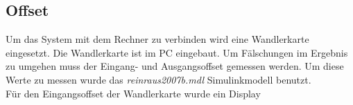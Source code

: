 \subsection{Offset}
Um das System mit dem Rechner zu verbinden wird eine Wandlerkarte eingesetzt. Die Wandlerkarte ist im PC eingebaut. Um Fälschungen im Ergebnis zu umgehen muss der Eingang- und Ausgangsoffset gemessen werden. Um diese Werte zu messen wurde das \textit{reinraus2007b.mdl} Simulinkmodell benutzt.\\

Für den Eingangsoffset der Wandlerkarte wurde ein Display 





